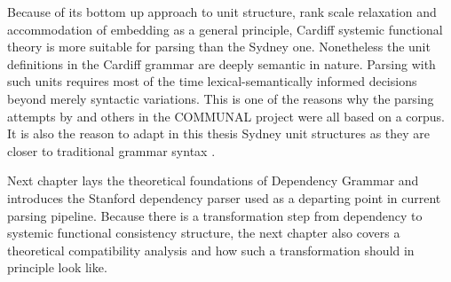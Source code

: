 Because of its bottom up approach to unit structure, rank scale relaxation and accommodation of embedding as a general principle, Cardiff systemic functional theory is more suitable for parsing than the Sydney one. Nonetheless the unit definitions in the Cardiff grammar are deeply semantic in nature. Parsing with such units requires most of the time lexical-semantically informed decisions beyond merely syntactic variations. This is one of the reasons why the parsing attempts by \citet{ODonoghue1991a} and others in the COMMUNAL project were all based on a corpus. It is also the reason to adapt in this thesis Sydney unit structures as they are closer to traditional grammar syntax \citep{Quirk1985}.

Next chapter lays the theoretical foundations of Dependency Grammar and introduces the Stanford dependency parser used as a departing point in current parsing pipeline. Because there is a transformation step from dependency to systemic functional consistency structure, the next chapter also covers a theoretical compatibility analysis and how such a transformation should in principle look like. 

